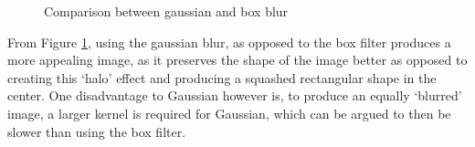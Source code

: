 \documentclass[twoside,a4paper,article]{combine}
\begin{document}
\begin{minipage}{\textwidth}\begin{figure}[H]
    \centering
    \caption{Comparison between gaussian and box blur}\label{fig:gauss_box}
\end{figure}\end{minipage}
From Figure \ref{fig:gauss_box}, using the gaussian blur, as opposed to
the box filter produces a more appealing image, as it preserves the shape of the image better as opposed to creating this `halo' effect
and producing a squashed rectangular shape in the center. One disadvantage to Gaussian however is, to produce an equally `blurred' image, a larger kernel is required for Gaussian, which can be argued to then be slower
than using the box filter\cite{Gonzalez_Woods_2018}.
\end{document}
